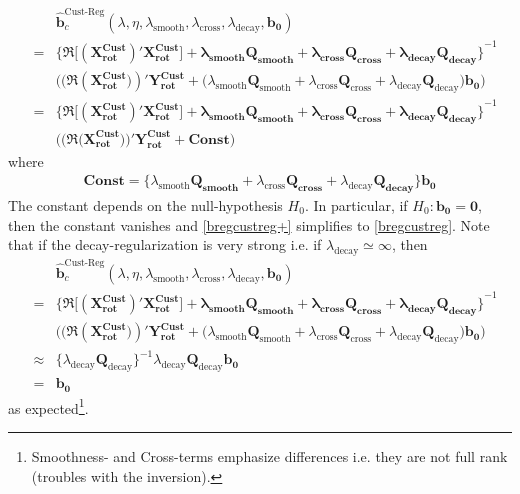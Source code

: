 \documentclass[11pt]{article}
\begin{document}
\begin{eqnarray}\label{bregcustreg+}
&&\mathbf{\hat{b}}^{\textrm{Cust-Reg}}_c(\lambda,\eta,\lambda_{\textrm{smooth}},\lambda_{\textrm{cross}},\lambda_{\textrm{decay}},\mathbf{b_0})\nonumber\\
&=&\mathbf{\Big\{\Re\Big[(X_{\textrm{rot}}^{\textrm{Cust} })' X_{\textrm{rot}}^{\textrm{Cust}}\Big]+
\lambda_{\textrm{smooth}}\mathbf{Q_{smooth}}+\lambda_{\textrm{cross}}\mathbf{Q_{cross}}+\lambda_{\textrm{decay}}\mathbf{Q_{decay}}
\Big\}}^{-1}\nonumber\\
&&\Bigg((\Re(\mathbf{X_{\textrm{rot}}^{\textrm{Cust}})})'
\mathbf{Y_{\textrm{rot}}^{\textrm{Cust}}}+
\Big(\lambda_{\textrm{smooth}}\mathbf{Q}_{\textrm{smooth}}+\lambda_{\textrm{cross}}\mathbf{Q}_{\textrm{cross}}+
\lambda_{\textrm{decay}}\mathbf{Q}_{\textrm{decay}}\Big)\mathbf{b_0}\Bigg)\nonumber\\
&=&\mathbf{\Big\{\Re\Big[(X_{\textrm{rot}}^{\textrm{Cust} })' X_{\textrm{rot}}^{\textrm{Cust}}\Big]+
\lambda_{\textrm{smooth}}\mathbf{Q_{smooth}}+\lambda_{\textrm{cross}}\mathbf{Q_{cross}}+\lambda_{\textrm{decay}}\mathbf{Q_{decay}}
\Big\}}^{-1}\nonumber\\
&&\Big((\Re(\mathbf{X_{\textrm{rot}}^{\textrm{Cust}}))}'
\mathbf{Y_{\textrm{rot}}^{\textrm{Cust}}}+\mathbf{Const}\Big)
\end{eqnarray}
where 
\begin{eqnarray*}
\mathbf{Const}=\Big\{\lambda_{\textrm{smooth}}\mathbf{Q_{\textrm{smooth}}}+\lambda_{\textrm{cross}}\mathbf{Q_{\textrm{cross}}}+
\lambda_{\textrm{decay}}\mathbf{Q_{\textrm{decay}}}\Big\}\mathbf{b_0}
\end{eqnarray*}
The constant depends on the null-hypothesis $H_0$. In particular, if $H_0: \mathbf{b_0=0}$, then the constant vanishes and \ref{bregcustreg+} simplifies to \ref{bregcustreg}.
Note that if the decay-regularization is very strong i.e. if $\lambda_{\textrm{decay}}\simeq \infty$, then 
\begin{eqnarray*}
&&\mathbf{\hat{b}}^{\textrm{Cust-Reg}}_c(\lambda,\eta,\lambda_{\textrm{smooth}},\lambda_{\textrm{cross}},\lambda_{\textrm{decay}},\mathbf{b_0})\nonumber\\
&=&\mathbf{\Big\{\Re\Big[(X_{\textrm{rot}}^{\textrm{Cust} })' X_{\textrm{rot}}^{\textrm{Cust}}\Big]+
\lambda_{\textrm{smooth}}\mathbf{Q_{smooth}}+\lambda_{\textrm{cross}}\mathbf{Q_{cross}}+\lambda_{\textrm{decay}}\mathbf{Q_{decay}}
\Big\}}^{-1}\nonumber\\
&&\Bigg((\Re(\mathbf{X_{\textrm{rot}}^{\textrm{Cust}})})'
\mathbf{Y_{\textrm{rot}}^{\textrm{Cust}}}+
\Big(\lambda_{\textrm{smooth}}\mathbf{Q}_{\textrm{smooth}}+\lambda_{\textrm{cross}}\mathbf{Q}_{\textrm{cross}}+
\lambda_{\textrm{decay}}\mathbf{Q}_{\textrm{decay}}\Big)\mathbf{b_0}\Bigg)\nonumber\\
&\approx&\Big\{\lambda_{\textrm{decay}}\mathbf{Q}_{\textrm{decay}}\Big\}^{-1}\lambda_{\textrm{decay}}\mathbf{Q}_{\textrm{decay}}\mathbf{b_0}\\
&=&\mathbf{b_0}
\end{eqnarray*}
as expected\footnote{Smoothness- and Cross-terms emphasize differences i.e. they are not full rank (troubles with the inversion).}.
\end{document}
